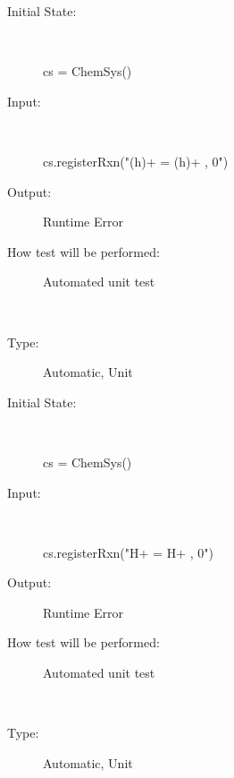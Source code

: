 \documentclass[12pt, titlepage]{article}
\newcounter{testnum} %
\begin{document}
\begin{addmargin}[2em]{0em}
\begin{addmargin}[2em]{0em}
\begin{description}
\item[Initial State:] ~\newline

\begin{python}
cs = ChemSys()
\end{python}
					
\item[Input:] ~\newline

\begin{python}
cs.registerRxn("(h)+ = (h)+ , 0") 
\end{python}
					
\item[Output:] Runtime Error
					
\item[How test will be performed:] Automated unit test\\
\end{description}
\end{addmargin}

\newpage
{}\\
\begin{addmargin}[2em]{0em}
\begin{description}
\item[Type:] Automatic, Unit
					
\item[Initial State:] ~\newline

\begin{python}
cs = ChemSys()
\end{python}
					
\item[Input:] ~\newline

\begin{python}
cs.registerRxn("H+ = H+ , 0") 
\end{python}
					
\item[Output:] Runtime Error
					
\item[How test will be performed:] Automated unit test\\
\end{description}
\end{addmargin}


\\
\begin{addmargin}[2em]{0em}
\begin{description}
\item[Type:] Automatic, Unit
					

\end{description}
\end{addmargin}
\end{addmargin}
\end{document}
